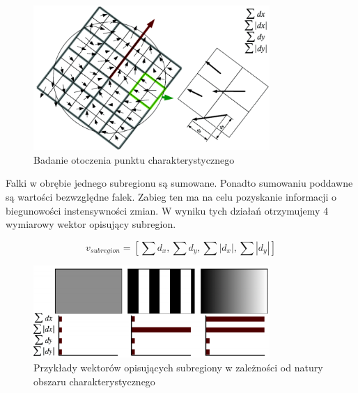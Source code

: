 \begin{figure}[!htb]
\centering
\includegraphics[width=0.8\textwidth]{pict/02/surf/surf_bay_scale_descriptor.png}
\caption{Badanie otoczenia punktu charakterystycznego}
\label{fig:surf_bay_scale_descriptor}
\end{figure}

Falki w obrębie jednego subregionu są sumowane. Ponadto sumowaniu poddawne są wartości bezwzględne falek. Zabieg ten ma na celu pozyskanie informacji o biegunowości instensywności zmian. W wyniku tych działań otrzymujemy 4 wymiarowy wektor opisujący subregion.

\begin{equation}
v_{subregion} = \left[ \sum d_x,\sum d_y,\sum |d_x|,\sum |d_y|\right] 
\end{equation}

\begin{figure}[!htb]
\centering
\includegraphics[width=0.8\textwidth]{pict/02/surf/surf_bay_gradient.png}
\caption{Przykłady wektorów opisujących subregiony w zależności od natury obszaru charakterystycznego}
\label{fig:surf_bay_gradient}
\end{figure}

